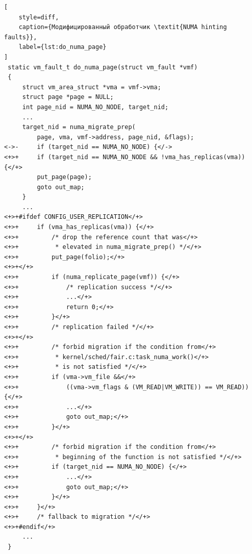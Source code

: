 \begin{lstlisting}[
	style=diff,
	caption={Модифицированный обработчик \textit{NUMA hinting faults}},
	label={lst:do_numa_page}
]
 static vm_fault_t do_numa_page(struct vm_fault *vmf)
 {
	 struct vm_area_struct *vma = vmf->vma;
	 struct page *page = NULL;
	 int page_nid = NUMA_NO_NODE, target_nid;
	 ...
	 target_nid = numa_migrate_prep(
		 page, vma, vmf->address, page_nid, &flags);
<->-	 if (target_nid == NUMA_NO_NODE) {</->
<+>+	 if (target_nid == NUMA_NO_NODE && !vma_has_replicas(vma)) {</+>
		 put_page(page);
		 goto out_map;
	 }
	 ...
<+>+#ifdef CONFIG_USER_REPLICATION</+>
<+>+	 if (vma_has_replicas(vma)) {</+>
<+>+		 /* drop the reference count that was</+>
<+>+		  * elevated in numa_migrate_prep() */</+>
<+>+		 put_page(folio);</+>
<+>+</+>
<+>+		 if (numa_replicate_page(vmf)) {</+>
<+>+			 /* replication success */</+>
<+>+			 ...</+>
<+>+			 return 0;</+>
<+>+		 }</+>
<+>+		 /* replication failed */</+>
<+>+</+>
<+>+		 /* forbid migration if the condition from</+>
<+>+		  * kernel/sched/fair.c:task_numa_work()</+>
<+>+		  * is not satisfied */</+>
<+>+		 if (vma->vm_file &&</+>
<+>+			 ((vma->vm_flags & (VM_READ|VM_WRITE)) == VM_READ)) {</+>
<+>+			 ...</+>
<+>+			 goto out_map;</+>
<+>+		 }</+>
<+>+</+>
<+>+		 /* forbid migration if the condition from</+>
<+>+		  * beginning of the function is not satisfied */</+>
<+>+		 if (target_nid == NUMA_NO_NODE) {</+>
<+>+			 ...</+>
<+>+			 goto out_map;</+>
<+>+		 }</+>
<+>+	 }</+>
<+>+	 /* fallback to migration */</+>
<+>+#endif</+>
	 ...
 }
\end{lstlisting}
\vspace{0.5cm}


